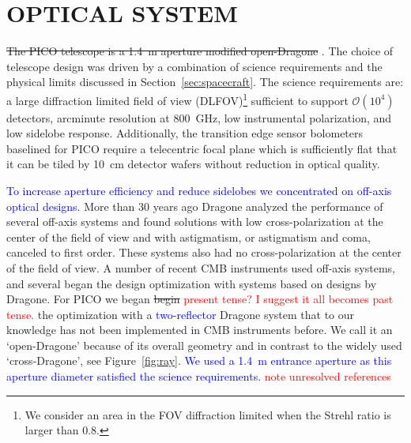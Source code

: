 \documentclass[]{spie}  %
\newcommand{\comr}[1]{\textcolor{red}{#1}}
\newcommand{\comb}[1]{\textcolor{blue}{#1}}
\newcommand{\como}[1]{\textcolor{orange}{#1}}
\begin{document}
\section{OPTICAL SYSTEM}
\label{sec:optics}

\sout{The PICO telescope is a 1.4~m aperture modified open-Dragone }.  The choice of telescope design was driven by a combination of science
requirements and the physical limits discussed in Section~\ref{sec:spacecraft}.  The science requirements are: a large diffraction 
limited field of view (DLFOV)\footnote{ We consider an area in the FOV diffraction limited when the Strehl ratio is 
larger than 0.8.} sufficient to support $\mathcal{O}(10^4)$ detectors, arcminute resolution at 800~GHz, low 
instrumental polarization, and low sidelobe response. Additionally, 
the transition edge sensor bolometers baselined for PICO require a telecentric focal plane which is sufficiently flat that it 
can be tiled by 10~cm detector wafers without reduction in optical quality. 

\comb{To increase aperture efficiency and reduce sidelobes we concentrated on off-axis optical designs.}
More than 30 years ago Dragone analyzed the 
performance of several off-axis systems and found solutions with low cross-polarization at the center of the field 
of view and with astigmatism, or astigmatism and coma, canceled to first order.\cite{dragone,dragone_coma,dragone1983} These
systems also had no cross-polarization at the center of the field of view. 
A number of recent CMB instruments used off-axis systems, and several 
began the design optimization with systems based on designs by
Dragone\cite{planck2000_optics,ACT2011_optics,SPT2008_optics,core2018_inst,LB2016_optics,parshley_ccat_spie}. 
For PICO we began \sout{begin} \comr{ present tense? I suggest it all becomes past tense.} 
the optimization with a \comb{two-reflector} Dragone system that to our knowledge has not been implemented in CMB instruments before. 
We call it an `open-Dragone' because of its overall geometry and in contrast to the widely used `cross-Dragone', see Figure~\ref{fig:ray}. 
\comb{We used a 1.4~m entrance aperture as this aperture diameter satisfied the science requirements.} \comr{note unresolved references}

\end{document}
